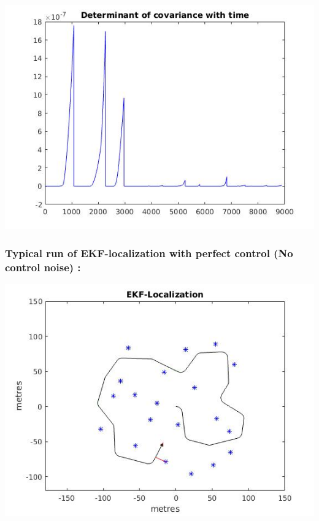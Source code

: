 \documentclass[a4paper,fleqn,11pt]{article}
\theoremstyle{mytheor}
\begin{document}
\begin{center}
\includegraphics[scale = 0.37]{../images/EKF-default1-cvt.jpg}
\end{center}

\subsubsection{Typical run of EKF-localization with perfect control (No control noise) :}

\begin{center}
\includegraphics[scale = 0.74]{../images/EKF-perfect-control.jpg} \\
\end{center}
\end{document}
